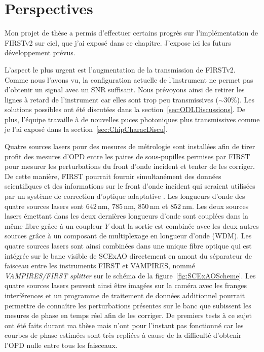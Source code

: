 \section{Perspectives}
\label{sec:V2SubaruProspectives}

Mon projet de thèse a permis d'effectuer certains progrès sur l'implémentation de \ac{FIRSTv2} sur ciel, que j'ai exposé dans ce chapitre. J'expose ici les futurs développement prévus.

L'aspect le plus urgent est l'augmentation de la transmission de \ac{FIRSTv2}. Comme nous l'avons vu, la configuration actuelle de l'instrument ne permet pas d'obtenir un signal avec un \ac{SNR} suffisant. Nous prévoyons ainsi de retirer les lignes à retard de l'instrument car elles sont trop peu transmissives ($\sim 30\%$). Les solutions possibles ont été discutées dans la section~\ref{sec:ODLDiscussions}. De plus, l'équipe travaille à de nouvelles puces photoniques plus transmissives comme je l'ai exposé dans la section~\ref{sec:ChipCharacDiscu}.

Quatre sources lasers pour des mesures de métrologie sont installées afin de tirer profit des mesures d'\ac{OPD} entre les paires de sous-pupilles permises par \ac{FIRST} pour mesurer les perturbations du front d'onde incident et tenter de les corriger. De cette manière, \ac{FIRST} pourrait fournir simultanément des données scientifiques et des informations sur le front d'onde incident qui seraient utilisées par un système de correction d'optique adaptative \citep{vievard2021}. Les longueurs d'onde des quatre sources lasers sont $642 \,$nm, $785 \,$nm, $850 \,$nm et $852 \,$nm. Les deux sources lasers émettant dans les deux dernières longueurs d'onde sont couplées dans la même fibre grâce à un coupleur $Y$ dont la sortie est combinée avec les deux autres sources grâce à un composant de multiplexage en longueur d'onde (\ac{WDM}). Les quatre sources lasers sont ainsi combinées dans une unique fibre optique qui est intégrée sur le banc visible de \ac{SCExAO} directement en amont du séparateur de faisceau entre les instruments \ac{FIRST} et \ac{VAMPIRES}, nommé \textit{VAMPIRES/FIRST splitter} sur le schéma de la figure~\ref{fig:SCExAOScheme}. Les quatre sources lasers peuvent ainsi être imagées sur la caméra avec les franges interférences et un programme de traitement de données additionnel pourrait permettre de connaître les perturbations présentes sur le banc que subissent les mesures de phase en temps réel afin de les corriger. De premiers tests à ce sujet ont été faits durant ma thèse mais n'ont pour l'instant pas fonctionné car les courbes de phase estimées sont très repliées à cause de la difficulté d'obtenir l'\ac{OPD} nulle entre tous les faisceaux.

